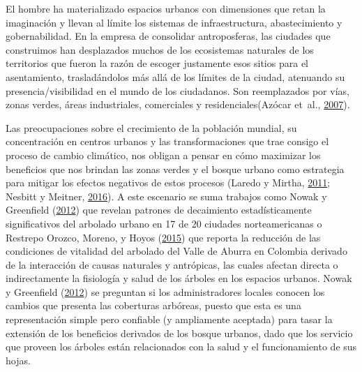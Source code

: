 \documentclass[12pt,a4paper,openany]{book}
\theoremstyle{definition}
\theoremstyle{definition}
\theoremstyle{definition}
\theoremstyle{remark}
\begin{document}
El hombre ha materializado espacios urbanos con dimensiones que retan la
imaginación y llevan al límite los sistemas de infraestructura,
abastecimiento y gobernabilidad. En la empresa de consolidar
antroposferas, las ciudades que construimos han desplazados muchos de
los ecosistemas naturales de los territorios que fueron la razón de
escoger justamente esos sitios para el asentamiento, trasladándolos más
allá de los límites de la ciudad, atenuando su presencia/visibilidad en
el mundo de los ciudadanos. Son reemplazados por vías, zonas verdes,
áreas industriales, comerciales y residenciales(Azócar et~al.,
\protect\hyperlink{ref-azocar_urbanization_2007}{2007}).

Las preocupaciones sobre el crecimiento de la población mundial, su
concentración en centros urbanos y las transformaciones que trae consigo
el proceso de cambio climático, nos obligan a pensar en cómo maximizar
los beneficios que nos brindan las zonas verdes y el bosque urbano como
estrategia para mitigar los efectos negativos de estos procesos (Laredo
y Mirtha, \protect\hyperlink{ref-laredo_gestion_2011}{2011}; Nesbitt y
Meitner, \protect\hyperlink{ref-nesbitt_exploring_2016}{2016}). A este
escenario se suma trabajos como Nowak y Greenfield
(\protect\hyperlink{ref-nowak_tree_2012}{2012}) que revelan patrones de
decaimiento estadísticamente significativos del arbolado urbano en 17 de
20 ciudades norteamericanas o Restrepo Orozco, Moreno, y Hoyos
(\protect\hyperlink{ref-restrepo_incidence_2015}{2015}) que reporta la
reducción de las condiciones de vitalidad del arbolado del Valle de
Aburra en Colombia derivado de la interacción de causas naturales y
antrópicas, las cuales afectan directa o indirectamente la fisiología y
salud de los árboles en los espacios urbanos. Nowak y Greenfield
(\protect\hyperlink{ref-nowak_tree_2012}{2012}) se preguntan si los
administradores locales conocen los cambios que presenta las coberturas
arbóreas, puesto que esta es una representación simple pero confiable (y
ampliamente aceptada) para tasar la extensión de los beneficios
derivados de los bosque urbanos, dado que los servicio que proveen los
árboles están relacionados con la salud y el funcionamiento de sus
hojas.
\end{document}
